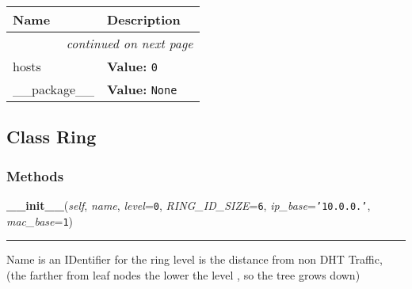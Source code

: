     \vspace{-1cm}
\hspace{\varindent}\begin{longtable}{|p{\varnamewidth}|p{\vardescrwidth}|l}
\cline{1-2}
\cline{1-2} \centering \textbf{Name} & \centering \textbf{Description}& \\
\cline{1-2}
\endhead\cline{1-2}\multicolumn{3}{r}{\small\textit{continued on next page}}\\\endfoot\cline{1-2}
\endlastfoot\raggedright h\-o\-s\-t\-s\- & \raggedright \textbf{Value:} 
{\tt 0}&\\
\cline{1-2}
\raggedright \_\-\_\-p\-a\-c\-k\-a\-g\-e\-\_\-\_\- & \raggedright \textbf{Value:} 
{\tt None}&\\
\cline{1-2}
\end{longtable}



\subsection{Class Ring}

    \label{Data_Plane_DHT:Ring}


  \subsubsection{Methods}

    \label{Data_Plane_DHT:Ring:__init__}

    \vspace{0.5ex}

\hspace{.8\funcindent}\begin{boxedminipage}{\funcwidth}

    \raggedright \textbf{\_\_init\_\_}(\textit{self}, \textit{name}, \textit{level}={\tt 0}, \textit{RING\_ID\_SIZE}={\tt 6}, \textit{ip\_base}={\tt \texttt{'}\texttt{10.0.0.}\texttt{'}}, \textit{mac\_base}={\tt 1})

    \vspace{-1.5ex}

    \rule{\textwidth}{0.5\fboxrule}
\setlength{\parskip}{2ex}
    Name is an IDentifier for the ring level is the distance from non DHT 
    Traffic, (the farther from leaf nodes the lower the level , so the tree
    grows down)

\setlength{\parskip}{1ex}
    \end{boxedminipage}

